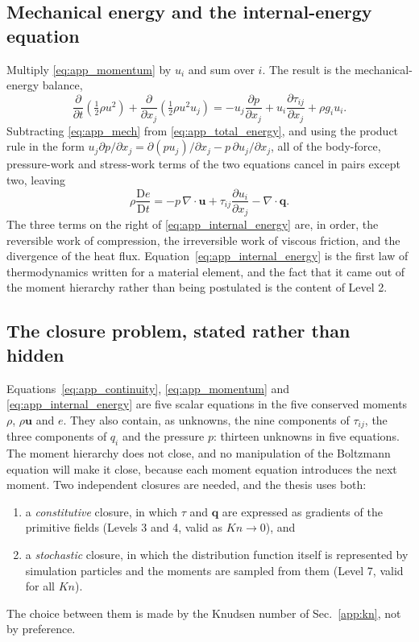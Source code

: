 \subsection{Mechanical energy and the internal-energy equation}

Multiply \eqref{eq:app_momentum} by $u_i$ and sum over $i$. The result is the mechanical-energy balance,
\begin{equation}
    \frac{\partial}{\partial t}\left(\tfrac12\rho u^2\right) + \frac{\partial}{\partial x_j}\left(\tfrac12\rho u^2u_j\right)
    = -u_j\frac{\partial p}{\partial x_j} + u_i\frac{\partial\tau_{ij}}{\partial x_j} + \rho g_iu_i .
    \label{eq:app_mech}
\end{equation}
Subtracting \eqref{eq:app_mech} from \eqref{eq:app_total_energy}, and using the product rule in the form $u_j\partial p/\partial x_j = \partial(pu_j)/\partial x_j - p\,\partial u_j/\partial x_j$, all of the body-force, pressure-work and stress-work terms of the two equations cancel in pairs except two, leaving
\begin{equation}
    \rho\frac{\mathrm{D}e}{\mathrm{D}t} = -p\,\nabla\cdot\mathbf{u} + \tau_{ij}\frac{\partial u_i}{\partial x_j} - \nabla\cdot\mathbf{q} .
    \label{eq:app_internal_energy}
\end{equation}
The three terms on the right of \eqref{eq:app_internal_energy} are, in order, the reversible work of compression, the irreversible work of viscous friction, and the divergence of the heat flux. Equation~\eqref{eq:app_internal_energy} is the first law of thermodynamics written for a material element, and the fact that it came out of the moment hierarchy rather than being postulated is the content of Level 2.

\subsection{The closure problem, stated rather than hidden}

Equations~\eqref{eq:app_continuity}, \eqref{eq:app_momentum} and \eqref{eq:app_internal_energy} are five scalar equations in the five conserved moments $\rho$, $\rho\mathbf{u}$ and $e$. They also contain, as unknowns, the nine components of $\tau_{ij}$, the three components of $q_i$ and the pressure $p$: thirteen unknowns in five equations. The moment hierarchy does not close, and no manipulation of the Boltzmann equation will make it close, because each moment equation introduces the next moment. Two independent closures are needed, and the thesis uses both:
\begin{enumerate}
    \item a \emph{constitutive} closure, in which $\tau$ and $\mathbf{q}$ are expressed as gradients of the primitive fields (Levels 3 and 4, valid as $Kn\to 0$), and
    \item a \emph{stochastic} closure, in which the distribution function itself is represented by simulation particles and the moments are sampled from them (Level 7, valid for all $Kn$).
\end{enumerate}
The choice between them is made by the Knudsen number of Sec.~\ref{app:kn}, not by preference.

